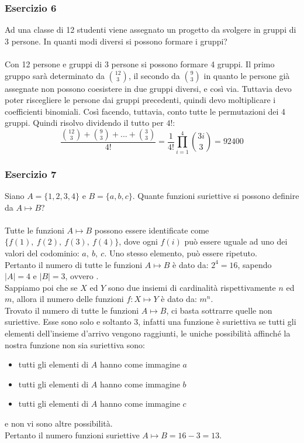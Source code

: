 \documentclass[italian]{article}
\newcommand{\dispr}[2]{\text{$D'_{#1,#2}$}}
\begin{document}
\subsubsection{Esercizio 6}
Ad una classe di 12 studenti viene assegnato un progetto da svolgere in gruppi di 3 persone. In quanti modi diversi si possono formare i gruppi?\\\\
Con 12 persone e gruppi di 3 persone si possono formare 4 gruppi. Il primo gruppo sarà determinato da $\binom{12}{3}$, il secondo da $\binom{9}{3}$ in quanto le persone già assegnate non possono coesistere in due gruppi diversi, e così via. Tuttavia devo poter riscegliere le persone dai gruppi precedenti, quindi devo moltiplicare i coefficienti binomiali. Così facendo, tuttavia, conto tutte le permutazioni dei 4 gruppi. Quindi risolvo dividendo il tutto per $4!$:
\[
	\dfrac{\binom{12}{3} + \binom{9}{3} + ... + \binom{3}{3}}{4!} = \dfrac{1}{4!}\prod_{i=1}^{4}\binom{3i}{3} = 92400
\]

\subsubsection{Esercizio 7}
Siano $A=\{ 1,2,3,4 \}$ e $B=\{ a,b,c \}$. Quante funzioni suriettive si possono definire da $A \longmapsto B$?\\\\
Tutte le funzioni $A \longmapsto B$ possono essere identificate come $\{f(1), \ f(2), \ f(3), \ f(4) \}$, dove ogni $f(i)$ può essere uguale ad uno dei valori del codominio: $a,\ b,\ c$. Uno stesso elemento, può essere ripetuto.\\[2mm]
Pertanto il numero di tutte le funzioni $A \longmapsto B$ è dato da: $2^4=16$, sapendo $|A|=4$ e $|B|=3$, ovvero \dispr{4}{3}.\\[2mm]
Sappiamo poi che se $X$ ed $Y$ sono due insiemi di cardinalità rispettivamente $n$ ed $m$, allora il numero delle funzioni $f:X \longmapsto Y$ è dato da: $m^n$.\\[2mm]
Trovato il numero di tutte le funzioni $A \longmapsto B$, ci basta sottrarre quelle non suriettive. Esse sono solo e soltanto 3, infatti una funzione è suriettiva se tutti gli elementi dell'insieme d'arrivo vengono raggiunti, le uniche possibilità affinché la nostra funzione non sia suriettiva sono:
\begin{itemize}[noitemsep, topsep=3pt]
	\item tutti gli elementi di $A$ hanno come immagine $a$
	\item tutti gli elementi di $A$ hanno come immagine $b$
	\item tutti gli elementi di $A$ hanno come immagine $c$
\end{itemize}
e non vi sono altre possibilità.\\[2mm]
Pertanto il numero funzioni suriettive $A \longmapsto B = 16-3 = 13$.
\end{document}
